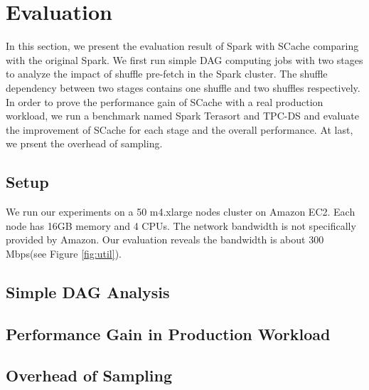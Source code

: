 \section{Evaluation}\label{evaluation}

In this section, we present the evaluation result of Spark with SCache comparing with the original Spark. We first run simple DAG computing jobs with two stages to analyze the impact of shuffle pre-fetch in the Spark cluster. The shuffle dependency between two stages contains one shuffle and two shuffles respectively. In order to prove the performance gain of SCache with a real production workload, we run a benchmark named Spark Terasort\cite{spark-tera} and TPC-DS\cite{tpcds} and evaluate the improvement of SCache for each stage and the overall performance. At last, we prsent the overhead of sampling.

\subsection{Setup}\label{stepup}
We run our experiments on a 50 m4.xlarge nodes cluster on Amazon EC2\cite{aws}. Each node has 16GB memory and 4 CPUs. The network bandwidth is not specifically provided by Amazon. Our evaluation reveals the bandwidth is about 300 Mbps(see Figure \ref{fig:util}).

\subsection{Simple DAG Analysis}

\subsection{Performance Gain in Production Workload}

\subsection{Overhead of Sampling}